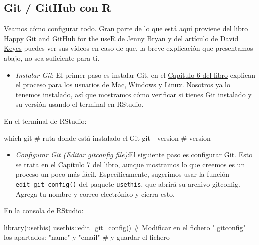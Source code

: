 \documentclass[
  letterpaper,
  DIV=11,
  numbers=noendperiod]{scrreprt}
\newenvironment{Shaded}{\begin{snugshade}}{\end{snugshade}}
\newcommand{\CommentTok}[1]{\textcolor[rgb]{0.37,0.37,0.37}{#1}}
\newcommand{\FunctionTok}[1]{\textcolor[rgb]{0.28,0.35,0.67}{#1}}
\newcommand{\NormalTok}[1]{\textcolor[rgb]{0.00,0.23,0.31}{#1}}
\newcommand{\SpecialCharTok}[1]{\textcolor[rgb]{0.37,0.37,0.37}{#1}}
\providecommand{\tightlist}{%
  \setlength{\itemsep}{0pt}\setlength{\parskip}{0pt}}\usepackage{longtable,booktabs,array}
\begin{document}
\subsection{Git / GitHub con R}\label{git-github-con-r}

Veamos cómo configurar todo. Gran parte de lo que está aquí proviene del
libro \href{https://happygitwithr.com/}{Happy Git and GitHub for the
useR} de Jenny Bryan y del artículo de
\href{https://rfortherestofus.com/2021/02/how-to-use-git-github-with-r/}{David
Keyes} puedes ver sus vídeos en caso de que, la breve explicación que
presentamos abajo, no sea suficiente para ti.

\begin{itemize}
\tightlist
\item
  {\emph{Instalar Git}}: El primer paso es instalar Git, en el
  \href{https://happygitwithr.com/install-git}{Capítulo 6 del libro}
  explican el proceso para los usuarios de Mac, Windows y Linux.
  Nosotros ya lo tenemos instalado, así que mostramos cómo verificar si
  tienes Git instalado y su versión usando el terminal en RStudio.
\end{itemize}

En el terminal de RStudio:

\begin{Shaded}
\begin{Highlighting}[]
\NormalTok{which git }\CommentTok{\# ruta donde está instalado el Git}
\NormalTok{git }\SpecialCharTok{{-}{-}}\NormalTok{version }\CommentTok{\# version}
\end{Highlighting}
\end{Shaded}

\begin{itemize}
\tightlist
\item
  {\emph{Configurar Git (Editar gitconfig file)}}:El siguiente paso es
  configurar Git. Esto se trata en el Capítulo 7 del libro, aunque
  mostramos lo que creemos es un proceso un poco más fácil.
  Específicamente, sugerimos usar la función
  \texttt{edit\_git\_config()} del paquete \texttt{usethis}, que abrirá
  su archivo gitconfig. Agrega tu nombre y correo electrónico y cierra
  esto.
\end{itemize}

En la consola de RStudio:

\begin{Shaded}
\begin{Highlighting}[]
\FunctionTok{library}\NormalTok{(usethis)}
\NormalTok{usethis}\SpecialCharTok{::}\FunctionTok{edit\_git\_config}\NormalTok{()}
\CommentTok{\# Modificar en el fichero ".gitconfig" los apartados: "name" y "email" }
\CommentTok{\# y guardar el fichero}
\end{Highlighting}
\end{Shaded}
\end{document}
